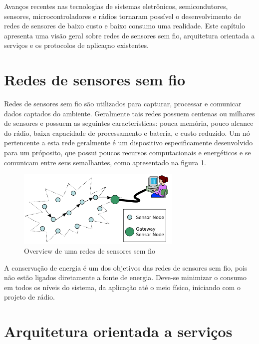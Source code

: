 Avan\c{c}os recentes nas tecnologias de sistemas eletr\^onicos, semicondutores, sensores, microcontroladores e r\'adios tornaram poss\'ivel o desenvolvimento de redes de sensores de baixo custo e baixo consumo uma realidade.
Este cap\'itulo apresenta uma vis\~ao geral sobre redes de sensores sem fio, arquitetura orientada a servi\c{c}os e os protocolos de aplica\c{c}ao existentes.

\section{Redes de sensores sem fio}

Redes de sensores sem fio s\~ao utilizados para capturar, processar e comunicar dados captados do ambiente. Geralmente tais redes possuem centenas ou milhares de sensores e possuem as seguintes caracter\'isticas: pouca mem\'oria, pouco alcance do r\'adio, baixa capacidade de processamento e bateria, e custo reduzido. Um n\'o pertencente a esta rede geralmente \'e um dispositivo especificamente desenvolvido para um pr\'oposito, que possui poucos recursos computacionais e energ\'eticos e se comunicam entre seus semalhantes, como apresentado na figura \ref{fig:a}.

\begin{figure}
   \label{fig:a}
   \centering
   \includegraphics[width=0.7\textwidth]{figuras/wsn.png}
   \caption{Overview de uma redes de sensores sem fio}
\end{figure}

A conserva\c{c}\~ao de energia \'e um dos objetivos das redes de sensores sem fio, pois n\~ao est\~ao ligados diretamente a fonte de energia. Deve-se minimizar o consumo em todos os n\'iveis do sistema, da aplica\c{c}\~ao at\'e o meio f\'isico, iniciando com o projeto de r\'adio. \cite{WsnSurvey2008} 


\section{Arquitetura orientada a servi\c{c}os}

